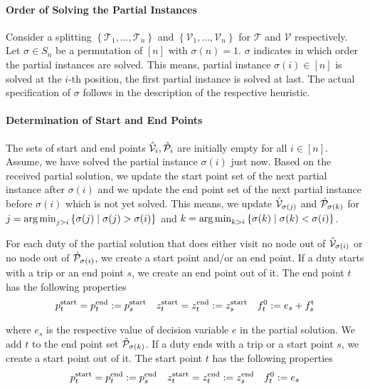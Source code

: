 \paragraph{Order of Solving the Partial Instances} \parfill

Consider a splitting $\left\{\mathcal{T}_1,\dots,\mathcal{T}_n\right\}$ and $\left\{\mathcal{V}_1,\dots,\mathcal{V}_n\right\}$ for $\mathcal{T}$ and $\mathcal{V}$ respectively. Let $\sigma\in S_n$ be a permutation of $[n]$ with $\sigma(n)=1$. $\sigma$ indicates in which order the partial instances are solved. This means, partial instance $\sigma(i)\in[n]$ is solved at the $i$-th position, the first partial instance is solved at last. The actual specification of $\sigma$ follows in the description of the respective heuristic. 

\paragraph{Determination of Start and End Points} \parfill

The sets of start and end points $\hat{\mathcal{V}}_i, \hat{\mathcal{P}}_i$ are initially empty for all $i\in[n]$. Assume, we have solved the partial instance $\sigma(i)$ just now. Based on the received partial solution, we update the start point set of the next partial instance after $\sigma(i)$ and we update the end point set of the next partial instance before $\sigma(i)$ which is not yet solved. This means, we update $\hat{\mathcal{V}}_{\sigma(j)}$ and $\hat{\mathcal{P}}_{\sigma(k)}$ for ${j=\operatorname*{arg\,min}_{j>i}\left\{\sigma(j)\mid \sigma(j)>\sigma(i)\right\}}$ and ${k=\operatorname*{arg\,min}_{k>i}\left\{\sigma(k)\mid \sigma(k)<\sigma(i)\right\}}$.

For each duty of the partial solution that does either visit no node out of $\hat{\mathcal{V}}_{\sigma(i)}$ or no node out of $\hat{\mathcal{P}}_{\sigma(i)}$, we create a start point and/or an end point. If a duty starts with a trip or an end point $s$, we create an end point out of it. The end point $t$ has the following properties
\begin{align*}
	p^{\operatorname{start}}_t = p^{\operatorname{end}}_t := p^{\operatorname{start}}_s && z^{\operatorname{start}}_t = z^{\operatorname{end}}_t := z^{\operatorname{start}}_s && f_t^0 := e_s + f^{\operatorname{t}}_s
\end{align*}

where $e_s$ is the respective value of decision variable $e$ in the partial solution. We add $t$ to the end point set $\hat{\mathcal{P}}_{\sigma(k)}$. If a duty ends with a trip or a start point $s$, we create a start point out of it. The start point $t$ has the following properties
\begin{align*}
	p^{\operatorname{start}}_t = p^{\operatorname{end}}_t := p^{\operatorname{end}}_s && z^{\operatorname{start}}_t = z^{\operatorname{end}}_t := z^{\operatorname{end}}_s && f_t^0 := e_s
\end{align*}

